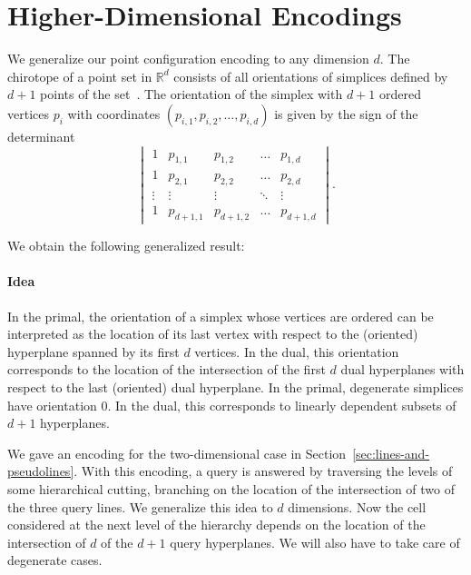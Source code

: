 \section{Higher-Dimensional Encodings}\label{sec:hyperplanes}
We generalize our point configuration encoding to any dimension \(d\). The
chirotope of a point set in \(\mathbb{R}^d\) consists of all orientations of
simplices defined by \(d+1\) points of the set~\cite{RZ04}.
The orientation of the simplex with \(d+1\) ordered vertices \(p_i\) with
coordinates \((p_{i,1} , p_{i,2} , \ldots, p_{i,d} )\) is given by the sign of
the determinant
%
\begin{displaymath}
  \begin{vmatrix}
    1 & p_{1,1} & p_{1,2} & \hdots & p_{1,d} \\
    1 & p_{2,1} & p_{2,2} & \hdots & p_{2,d} \\
    \vdots & \vdots & \vdots & \ddots & \vdots \\
    1 & p_{d+1,1} & p_{d+1,2} & \hdots & p_{d+1,d}
  \end{vmatrix}.
\end{displaymath}

We obtain the following generalized result:
%



\paragraph*{Idea}

In the primal, the orientation of a simplex whose vertices are ordered can be
interpreted as the location of its last vertex with respect to the (oriented)
hyperplane spanned by its first \(d\) vertices. In the dual, this orientation
corresponds to the location of the intersection of the first \(d\) dual
hyperplanes with respect to the last (oriented) dual hyperplane.
%
\ifjournal%
  In the primal, degenerate simplices have orientation \(0\). In the dual, this
  corresponds to linearly dependent subsets of \(d+1\) hyperplanes.
\fi%

We gave an encoding for the two-dimensional case in Section~\ref{sec:lines-and-pseudolines}.
With this encoding, a query is answered by traversing the levels of
some hierarchical cutting, branching on the location of the intersection of two
of the three query lines. We generalize this idea to \(d\) dimensions. Now the
cell considered at the next level of the hierarchy depends on the location
of the intersection of \(d\) of the \(d+1\) query hyperplanes.
\ifjournal%
  We will also have to take care of degenerate cases.
\fi%

